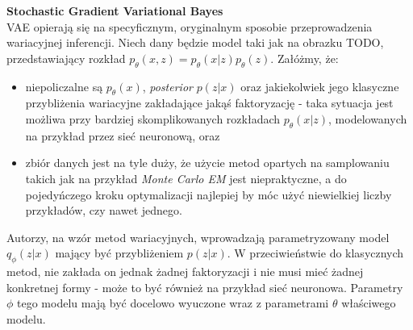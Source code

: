\documentclass[magisterska]{pracamgr}
\begin{document}
\noindent \textbf{Stochastic Gradient Variational Bayes} \\

VAE opierają się na specyficznym, oryginalnym sposobie przeprowadzenia wariacyjnej inferencji. Niech dany będzie model taki jak na obrazku TODO, przedstawiający rozkład $p_{\theta}(x, z) = p_{\theta}(x | z) p_{\theta}(z)$. Załóżmy, że:
\begin{itemize}
    \item niepoliczalne są $p_{\theta}(x)$, \textit{posterior} $p(z | x)$ oraz jakiekolwiek jego klasyczne przybliżenia wariacyjne zakładające jakąś faktoryzację - taka sytuacja jest możliwa przy bardziej skomplikowanych rozkładach $p_{\theta}(x | z)$, modelowanych na przykład przez sieć neuronową, oraz
    \item zbiór danych jest na tyle duży, że użycie metod opartych na samplowaniu takich jak na przykład \textit{Monte Carlo EM} jest niepraktyczne, a do pojedyńczego kroku optymalizacji najlepiej by móc użyć niewielkiej liczby przykładów, czy nawet jednego.
\end{itemize}
Autorzy, na wzór metod wariacyjnych, wprowadzają parametryzowany model $q_{\phi}(z | x)$ mający być przybliżeniem $p(z | x)$. W przeciwieństwie do klasycznych metod, nie zakłada on jednak żadnej faktoryzacji i nie musi mieć żadnej konkretnej formy - może to być również na przykład sieć neuronowa. Parametry $\phi$ tego modelu mają być docelowo wyuczone wraz z parametrami $\theta$ właściwego modelu.
\end{document}
